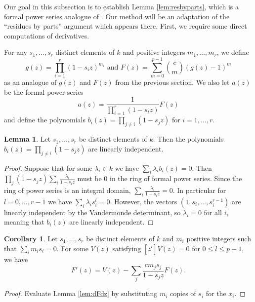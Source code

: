 \documentclass{amsart}
\numberwithin{equation}{section}
\theoremstyle{definition}
\newtheorem{lemma}[theorem]{Lemma}
\newtheorem{corollary}[theorem]{Corollary}
\begin{document}
Our goal in this subsection is to establish Lemma \ref{lem:resbyparts}, which is a formal power series analogue of \cite[Lemma 3.4]{CE}.  Our method will be an adaptation of the ``residues by parts'' argument which appears there.  First, we require some direct computations of derivatives.

For any $s_1,\dots,s_{r}$ distinct elements of $k$ and positive integers $m_1,\dots,m_r$, we define 
\[
g(z)=\prod_{i=1}^{r} (1-s_iz)^{m_i} \text{  and } F(z)=\sum_{m=0}^{p-1} \binom{c}{m}(g(z)-1)^m
\]
as an analogue of $g(z)$ and $F(z)$ from the previous section. We also let $a(z)$ be the formal power series
\[
a(z)=\frac{1}{\prod_{i=1}^{r}(1-s_iz)}F(z)
\]
and define the polynomials $b_i(z) = \prod_{j \neq i} (1 - s_j z)$ for $i=1, \dots, r$. 

\begin{lemma}\label{lem:vand}Let $s_1, \ldots, s_{r }$ be distinct elements of $k$.  Then the polynomials $b_i(z) = \prod_{j \neq i} (1 - s_j z)$ are linearly independent.
\end{lemma}
\begin{proof} 
Suppose that for some $\lambda_i \in k$ we have $\sum_i \lambda_ib_i(z)=0$.  Then $\prod_j (1-s_jz)\sum_i \frac{\lambda_i}{1-s_iz}$ must be $0$ in the ring of formal power series. Since the ring of power series is an integral domain, $\sum_i \frac{\lambda_i}{1-s_iz}=0$. In particular for $l=0,\dots,r-1$ we have $\sum_i \lambda_is_i^l=0$.  However, the vectors $(1,s_i,\dots,s_i^{r-1})$ are linearly independent by the Vandermonde determinant, so $\lambda_i=0$ for all $i$, meaning that $b_i(z)$ are linearly independent.
\end{proof}

\begin{corollary}\label{corr:dFdz2}
Let $s_1,\dots,s_{r}$ be distinct elements of $k$ and $m_i$ positive integers such that $\sum_i m_is_i=0$.  
For some $V(z)$ satisfying $[z^l]V(z)=0$ for $0 \le l \le p-1$, we have
\[
F'(z)=V(z) - \sum_j \frac{cm_js_j}{1-s_jz}F(z).
\]
\end{corollary}
\begin{proof}
Evaluate Lemma \ref{lem:dFdz} by substituting $m_i$ copies of $s_i$ for the $x_i$.
\end{proof}
\end{document}

